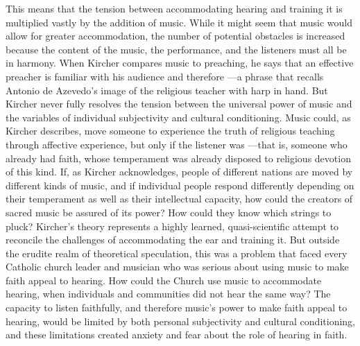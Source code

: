 This means that the tension between accommodating hearing and training it is multiplied vastly by the addition of music.
While it might seem that music would allow for greater accommodation, the number of potential obstacles is increased because the content of the music, the performance, and the listeners must all be in harmony.
When Kircher compares music to preaching, he says that an effective preacher is familiar with his audience and therefore ---a phrase that recalls Antonio de Azevedo's image of the religious teacher with harp in hand.
\Autocite[551:  .]{Kircher:Musurgia}
But Kircher never fully resolves the tension between the universal power of music and the variables of individual subjectivity and cultural conditioning.
Music could, as Kircher describes, move someone to experience the truth of religious teaching through affective experience, but only if the listener was ---that is, someone who already had faith, whose temperament was already disposed to religious devotion of this kind.
If, as Kircher acknowledges, people of different nations are moved by different kinds of music, and if individual people respond differently depending on their temperament as well as their intellectual capacity, how could the creators of sacred music be assured of its power? How could they know which strings to pluck?
Kircher's theory represents a highly learned, quasi-scientific attempt to reconcile the challenges of accommodating the ear and training it.
But outside the erudite realm of theoretical speculation, this was a problem that faced every Catholic church leader and musician who was serious about using music to make faith appeal to hearing.
How could the Church use music to accommodate hearing, when individuals and communities did not hear the same way?  The capacity to listen faithfully, and therefore music's power to make faith appeal to hearing, would be limited by both personal subjectivity and cultural conditioning, and these limitations created anxiety and fear about the role of hearing in faith.

\endinput

\section{Danger and Doubt}


